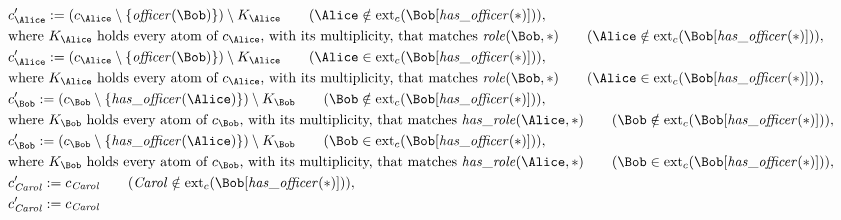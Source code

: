 \begin{align*}
&
c'_
{
\Alice
}
 := 
(c_
{
\Alice
}
 \setminus 
\{
\mathit{\detokenize{
officer
}}
(
\Bob
)
\}
) \setminus K_
{
\Alice
}
 \qquad (
\Alice
 \notin 
\mathrm{ext}_c(
\Bob
[
\mathit{\detokenize{
has_officer
}}
(
\ast
)
]
)
)
,\\
&
\text{where } K_
{
\Alice
}
 \text{ holds every atom of } c_
{
\Alice
}
 \text{, with its multiplicity, that matches } 
\mathit{\detokenize{
role
}}
(
\Bob
,
\ast
)
 \qquad (
\Alice
 \notin 
\mathrm{ext}_c(
\Bob
[
\mathit{\detokenize{
has_officer
}}
(
\ast
)
]
)
)
,\\
&
c'_
{
\Alice
}
 := 
(c_
{
\Alice
}
 \setminus 
\{
\mathit{\detokenize{
officer
}}
(
\Bob
)
\}
) \setminus K_
{
\Alice
}
 \qquad (
\Alice
 \in 
\mathrm{ext}_c(
\Bob
[
\mathit{\detokenize{
has_officer
}}
(
\ast
)
]
)
)
,\\
&
\text{where } K_
{
\Alice
}
 \text{ holds every atom of } c_
{
\Alice
}
 \text{, with its multiplicity, that matches } 
\mathit{\detokenize{
role
}}
(
\Bob
,
\ast
)
 \qquad (
\Alice
 \in 
\mathrm{ext}_c(
\Bob
[
\mathit{\detokenize{
has_officer
}}
(
\ast
)
]
)
)
,\\
&
c'_
{
\Bob
}
 := 
(c_
{
\Bob
}
 \setminus 
\{
\mathit{\detokenize{
has_officer
}}
(
\Alice
)
\}
) \setminus K_
{
\Bob
}
 \qquad (
\Bob
 \notin 
\mathrm{ext}_c(
\Bob
[
\mathit{\detokenize{
has_officer
}}
(
\ast
)
]
)
)
,\\
&
\text{where } K_
{
\Bob
}
 \text{ holds every atom of } c_
{
\Bob
}
 \text{, with its multiplicity, that matches } 
\mathit{\detokenize{
has_role
}}
(
\Alice
,
\ast
)
 \qquad (
\Bob
 \notin 
\mathrm{ext}_c(
\Bob
[
\mathit{\detokenize{
has_officer
}}
(
\ast
)
]
)
)
,\\
&
c'_
{
\Bob
}
 := 
(c_
{
\Bob
}
 \setminus 
\{
\mathit{\detokenize{
has_officer
}}
(
\Alice
)
\}
) \setminus K_
{
\Bob
}
 \qquad (
\Bob
 \in 
\mathrm{ext}_c(
\Bob
[
\mathit{\detokenize{
has_officer
}}
(
\ast
)
]
)
)
,\\
&
\text{where } K_
{
\Bob
}
 \text{ holds every atom of } c_
{
\Bob
}
 \text{, with its multiplicity, that matches } 
\mathit{\detokenize{
has_role
}}
(
\Alice
,
\ast
)
 \qquad (
\Bob
 \in 
\mathrm{ext}_c(
\Bob
[
\mathit{\detokenize{
has_officer
}}
(
\ast
)
]
)
)
,\\
&
c'_
{
\mathit{Carol}
}
 := 
c_
{
\mathit{Carol}
}
 \qquad (
\mathit{Carol}
 \notin 
\mathrm{ext}_c(
\Bob
[
\mathit{\detokenize{
has_officer
}}
(
\ast
)
]
)
)
,\\
&
c'_
{
\mathit{Carol}
}
 := 
c_
{
\mathit{Carol}
}
\end{align*}

